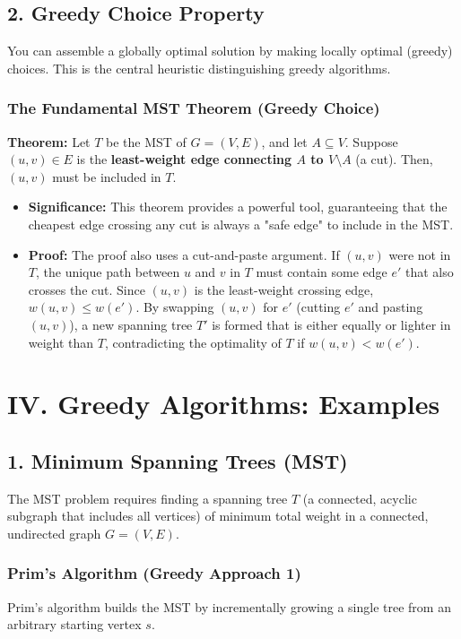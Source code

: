 \documentclass{article}
\begin{document}
\subsection{2. Greedy Choice Property}
You can assemble a globally optimal solution by making locally optimal (greedy) choices. This is the central heuristic distinguishing greedy algorithms.

\subsubsection*{The Fundamental MST Theorem (Greedy Choice)}
\textbf{Theorem:} Let $T$ be the MST of $G=(V, E)$, and let $A \subseteq V$. Suppose $(u, v) \in E$ is the \textbf{least-weight edge connecting $A$ to $V \setminus A$} (a cut). Then, $(u, v)$ must be included in $T$.

\begin{itemize}
    \item \textbf{Significance:} This theorem provides a powerful tool, guaranteeing that the cheapest edge crossing any cut is always a "safe edge" to include in the MST.
    \item \textbf{Proof:} The proof also uses a cut-and-paste argument. If $(u, v)$ were not in $T$, the unique path between $u$ and $v$ in $T$ must contain some edge $e'$ that also crosses the cut. Since $(u, v)$ is the least-weight crossing edge, $w(u, v) \le w(e')$. By swapping $(u, v)$ for $e'$ (cutting $e'$ and pasting $(u, v)$), a new spanning tree $T'$ is formed that is either equally or lighter in weight than $T$, contradicting the optimality of $T$ if $w(u, v) < w(e')$.
\end{itemize}

\section{IV. Greedy Algorithms: Examples}

\subsection{1. Minimum Spanning Trees (MST)}

The MST problem requires finding a spanning tree $T$ (a connected, acyclic subgraph that includes all vertices) of minimum total weight in a connected, undirected graph $G=(V, E)$.

\subsubsection*{Prim’s Algorithm (Greedy Approach 1)}
Prim's algorithm builds the MST by incrementally growing a single tree from an arbitrary starting vertex $s$.
\end{document}
